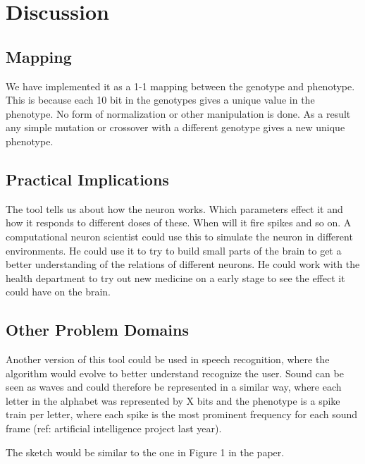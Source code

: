 \documentclass[12pt, a4paper, oneside, titlepage]{article}
\begin{document}
\section{Discussion}

\subsection{Mapping}
We have implemented it as a 1-1 mapping between the genotype and phenotype. This is because each 10 bit in the genotypes gives a unique value in the phenotype. No form of normalization or other manipulation is done. As a result any simple mutation or crossover with a different genotype gives a new unique phenotype.

\subsection{Practical Implications}
The tool tells us about how the neuron works. Which parameters effect it and how it responds to different doses of these. When will it fire spikes and so on. 
A computational neuron scientist could use this to simulate the neuron in different environments. He could use it to try to build small parts of the brain to get a better understanding of the relations of different neurons. 
He could work with the health department to try out new medicine on a early stage to see the effect it could have on the brain.  

\subsection{Other Problem Domains}
Another version of this tool could be used in speech recognition, where the algorithm would evolve to better understand recognize the user. Sound can be seen as waves and could therefore be represented in a similar way, where each letter in the alphabet was represented by X bits and the phenotype is a spike train per letter, where each spike is the most prominent frequency for each sound frame (ref: artificial intelligence project last year). 

The sketch would be similar to the one in Figure 1 in the paper.
\end{document}
